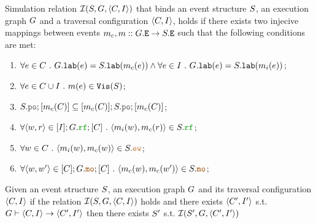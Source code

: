 \documentclass[12pt]{article}
\begin{document}
\begin{definition}
  Simulation relation $\mathcal{I}(S, G, \langle C, I \rangle)$ that binds an 
  event structure $S$, an \imm execution graph $G$ and 
  a traversal configuration $\langle C, I \rangle$,
  holds if there exists two injecive mappings between events 
  $m_{c}, m :: G.{\mathtt{E}} \rightarrow S.{\mathtt{E}}$
  such that the following conditions are met:
  \begin{enumerate}[label=\textbf{S.\arabic*}]
    \item \label{item:sim-lab}
      $\forall{e \in C} ~.~ G.{\mathtt{lab}}(e) = S.{\mathtt{lab}}(m_{c}(e)) \wedge
       \forall{e \in I} ~.~ G.{\mathtt{lab}}(e) = S.{\mathtt{lab}}(m_{i}(e))$;
    \item \label{item:sim-vis} 
      $\forall{e \in C\cup I} ~.~ m(e) \in {\mathtt{Vis}}(S)$;
    \item \label{item:sim-po} 
      $\lES.\lPO;[\lMC(\lC)] \subseteq [\lMC(\lC)];\lES.\lPO;[\lMC(\lC)]$;
    \item \label{item:sim-rf} 
      $\forall{\tup{w, r} \in [\lI];\lG.\lRF;[\lC]} ~.~ \tup{\lMI(w), \lMC(r)} \in \lES.\lRF$;
    \item \label{item:sim-ew} 
      $\forall{w \in \lC} ~.~ \tup{\lMI(w), \lMC(w)} \in \lES.\lEW$;
    \item \label{item:sim-mo}
      $\forall{\tup{w, w'} \in [\lC];\lG.\lMO;[\lC]} ~.~ \tup{\lMC(w), \lMC(w')} \in \lES.\lMO$;
  \end{enumerate}
\end{definition}

\begin{lemma}
  Given an event structure $S$, an \imm execution graph $G$ 
  and its traversal configuration $\langle C, I \rangle$
  if the relation $\mathcal{I}(S, G, \langle C, I \rangle)$ holds and 
  there exists $\langle C', I' \rangle$ s.t. $G \vdash \langle C, I \rangle \rightarrow \langle C', I' \rangle$
  then there exists $S'$ s.t. $\mathcal{I}(S', G, \langle C', I' \rangle)$ 
\end{lemma}
\end{document}
